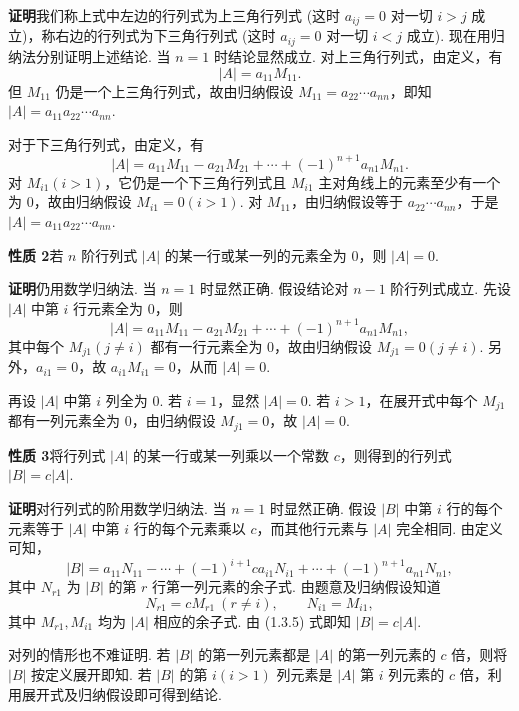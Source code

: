 \documentclass[UTF8, 12pt, fontset=fandol, oneside]{ctexart}
\begin{document}
\noindent\textbf{证明}\quad 我们称上式中左边的行列式为上三角行列式 (这时 $a_{ij}=0$ 对一切 $i>j$ 成立)，称右边的行列式为下三角行列式 (这时 $a_{ij}=0$ 对一切 $i<j$ 成立).
现在用归纳法分别证明上述结论. 当 $n=1$ 时结论显然成立. 对上三角行列式，由定义，有
\[
|A|=a_{11}M_{11}.
\]
但 $M_{11}$ 仍是一个上三角行列式，故由归纳假设 $M_{11}=a_{22}\cdots a_{nn}$，即知 $|A|=a_{11}a_{22}\cdots a_{nn}$.

对于下三角行列式，由定义，有
\begin{equation}
|A|=a_{11}M_{11}-a_{21}M_{21}+\cdots+(-1)^{n+1}a_{n1}M_{n1}.
\tag{1.3.4}
\end{equation}
对 $M_{i1}(i>1)$，它仍是一个下三角行列式且 $M_{i1}$ 主对角线上的元素至少有一个为 0，故由归纳假设 $M_{i1}=0(i>1)$. 对 $M_{11}$，由归纳假设等于 $a_{22}\cdots a_{nn}$，于是 $|A|=a_{11}a_{22}\cdots a_{nn}$.

\noindent\textbf{性质 2}\quad 若 $n$ 阶行列式 $|A|$ 的某一行或某一列的元素全为 0，则 $|A|=0$.

\noindent\textbf{证明}\quad 仍用数学归纳法. 当 $n=1$ 时显然正确. 假设结论对 $n-1$ 阶行列式成立. 先设 $|A|$ 中第 $i$ 行元素全为 0，则
\[
|A|=a_{11}M_{11}-a_{21}M_{21}+\cdots+(-1)^{n+1}a_{n1}M_{n1},
\]
其中每个 $M_{j1}(j\ne i)$ 都有一行元素全为 0，故由归纳假设 $M_{j1}=0(j\ne i)$. 另外，$a_{i1}=0$，故 $a_{i1}M_{i1}=0$，从而 $|A|=0$.

再设 $|A|$ 中第 $i$ 列全为 0. 若 $i=1$，显然 $|A|=0$. 若 $i>1$，在展开式中每个 $M_{j1}$ 都有一列元素全为 0，由归纳假设 $M_{j1}=0$，故 $|A|=0$.

\noindent\textbf{性质 3}\quad 将行列式 $|A|$ 的某一行或某一列乘以一个常数 $c$，则得到的行列式 $|B|=c|A|$.

\noindent\textbf{证明}\quad 对行列式的阶用数学归纳法. 当 $n=1$ 时显然正确. 假设 $|B|$ 中第 $i$ 行的每个元素等于 $|A|$ 中第 $i$ 行的每个元素乘以 $c$，而其他行元素与 $|A|$ 完全相同. 由定义可知，
\begin{equation}
|B|=a_{11}N_{11}-\cdots+(-1)^{i+1}ca_{i1}N_{i1}+\cdots+(-1)^{n+1}a_{n1}N_{n1},
\tag{1.3.5}
\end{equation}
其中 $N_{r1}$ 为 $|B|$ 的第 $r$ 行第一列元素的余子式. 由题意及归纳假设知道
\[
N_{r1}=cM_{r1}\ (r\ne i),\qquad N_{i1}=M_{i1},
\]
其中 $M_{r1},M_{i1}$ 均为 $|A|$ 相应的余子式. 由 (1.3.5) 式即知 $|B|=c|A|$.

对列的情形也不难证明. 若 $|B|$ 的第一列元素都是 $|A|$ 的第一列元素的 $c$ 倍，则将 $|B|$ 按定义展开即知. 若 $|B|$ 的第 $i(i>1)$ 列元素是 $|A|$ 第 $i$ 列元素的 $c$ 倍，利用展开式及归纳假设即可得到结论.
\end{document}

